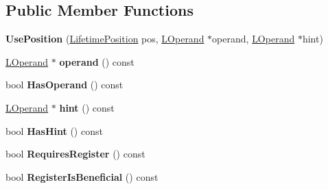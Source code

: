 \subsection*{Public Member Functions}
\begin{DoxyCompactItemize}
\item 
\hypertarget{classv8_1_1internal_1_1_use_position_af3d4a5a3dcf445235f9e1854f02ca8cc}{}{\bfseries Use\+Position} (\hyperlink{classv8_1_1internal_1_1_lifetime_position}{Lifetime\+Position} pos, \hyperlink{classv8_1_1internal_1_1_l_operand}{L\+Operand} $\ast$operand, \hyperlink{classv8_1_1internal_1_1_l_operand}{L\+Operand} $\ast$hint)\label{classv8_1_1internal_1_1_use_position_af3d4a5a3dcf445235f9e1854f02ca8cc}

\item 
\hypertarget{classv8_1_1internal_1_1_use_position_a0190d80a08f786552122d126defa46e2}{}\hyperlink{classv8_1_1internal_1_1_l_operand}{L\+Operand} $\ast$ {\bfseries operand} () const \label{classv8_1_1internal_1_1_use_position_a0190d80a08f786552122d126defa46e2}

\item 
\hypertarget{classv8_1_1internal_1_1_use_position_a59dcf5faa98834b835d9ea27f7be61de}{}bool {\bfseries Has\+Operand} () const \label{classv8_1_1internal_1_1_use_position_a59dcf5faa98834b835d9ea27f7be61de}

\item 
\hypertarget{classv8_1_1internal_1_1_use_position_aa52bbe57f7c73b31a0915235d8598401}{}\hyperlink{classv8_1_1internal_1_1_l_operand}{L\+Operand} $\ast$ {\bfseries hint} () const \label{classv8_1_1internal_1_1_use_position_aa52bbe57f7c73b31a0915235d8598401}

\item 
\hypertarget{classv8_1_1internal_1_1_use_position_a43b0fcf35ca6c64e66f58d3dc742cd02}{}bool {\bfseries Has\+Hint} () const \label{classv8_1_1internal_1_1_use_position_a43b0fcf35ca6c64e66f58d3dc742cd02}

\item 
\hypertarget{classv8_1_1internal_1_1_use_position_a725000aed2d14de75acfab72ef8ea0c4}{}bool {\bfseries Requires\+Register} () const \label{classv8_1_1internal_1_1_use_position_a725000aed2d14de75acfab72ef8ea0c4}

\item 
\hypertarget{classv8_1_1internal_1_1_use_position_afe6202b7a7aedcac72cbab18d34ae1c6}{}bool {\bfseries Register\+Is\+Beneficial} () const \label{classv8_1_1internal_1_1_use_position_afe6202b7a7aedcac72cbab18d34ae1c6}


\end{DoxyCompactItemize}
